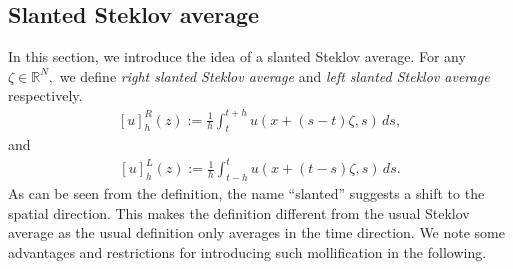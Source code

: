 \documentclass[notitlepage,11pt,reqno]{amsart}
\theoremstyle{definition}
\numberwithin{equation}{section}
\newcommand{\RR}{\mathds{R}}
\begin{document}
\subsection{Slanted Steklov average}\label{subsec:slanting}
In this section, we introduce the idea of a slanted Steklov average. For any $\zeta \in \RR^N,$ we define \textit{right slanted Steklov average} and \textit{left slanted Steklov average} respectively. 
\begin{align}\label{right slanted steklov}
[u]_{h}^{R}(z):=\frac{1}{h}\int_{t}^{t+h}u(x+(s-t)\zeta,s)\, ds,
\end{align}
and 
\begin{align}\label{left slanted steklov}
 [u]_{h}^{L}(z):=\frac{1}{h}\int_{t-h}^{t}u(x+(t-s)\zeta,s)\, ds.
\end{align}
As can be seen from the definition, the name ``slanted'' suggests a shift to the spatial direction. This makes the definition different from the usual Steklov average as the usual definition only averages in the time direction. We note some advantages and restrictions for introducing such mollification in the following.
\end{document}
